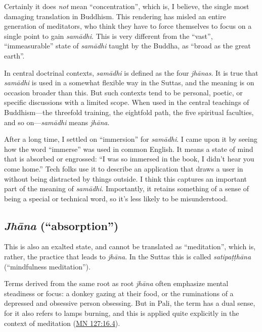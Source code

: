 \documentclass[12pt,openany]{book}%
\begin{document}
Certainly it does \emph{not} mean “concentration”, which is, I believe, the single most damaging translation in Buddhism. This rendering has misled an entire generation of meditators, who think they have to force themselves to focus on a single point to gain \textit{\textsanskrit{samādhi}}. This is very different from the “vast”, “immeasurable” state of \textit{\textsanskrit{samādhi}} taught by the Buddha, as “broad as the great earth”.

In central doctrinal contexts, \textit{\textsanskrit{samādhi}} is defined as the four \textit{\textsanskrit{jhānas}}. It is true that  \textit{\textsanskrit{samādhi}} is used in a somewhat flexible way in the Suttas, and the meaning is on occasion broader than this. But such contexts tend to be personal, poetic, or specific discussions with a limited scope. When used in the central teachings of Buddhism—the threefold training, the eightfold path, the five spiritual faculties, and so on—\textit{\textsanskrit{samādhi}} means \textit{\textsanskrit{jhāna}}.

After a long time, I settled on “immersion” for \textit{\textsanskrit{samādhi}}. I came upon it by seeing how the word “immerse” was used in common English. It means a state of mind that is absorbed or engrossed: “I was so immersed in the book, I didn’t hear you come home.” Tech folks use it to describe an application that draws a user in without being distracted by things outside. I think this captures an important part of the meaning of \textit{\textsanskrit{samādhi}}. Importantly, it retains something of a sense of being a special or technical word, so it’s less likely to be misunderstood.

\subsection*{\textit{\textsanskrit{Jhāna}} (“absorption”)}

This is also an exalted state, and cannot be translated as “meditation”, which is, rather, the practice that leads to \textit{\textsanskrit{jhāna}}. In the Suttas this is called \textit{\textsanskrit{satipaṭṭhāna}} (“mindfulness meditation”).

Terms derived from the same root as root \textit{\textsanskrit{jhāna}} often emphasize mental steadiness or focus: a donkey gazing at their food, or the ruminations of a depressed and obsessive person obsessing. But in Pali, the term has a dual sense, for it also refers to lamps burning, and this is applied quite explicitly in the context of meditation (\href{https://suttacentral.net/mn127/en/sujato\#16.4}{MN 127:16.4}).
\end{document}
